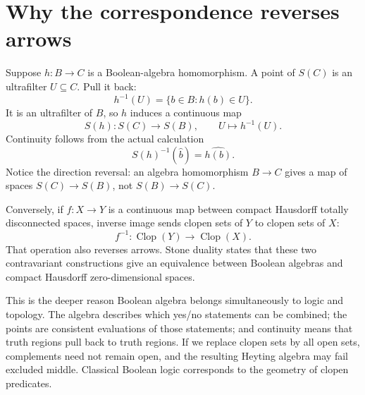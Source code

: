 \section{Why the correspondence reverses arrows}

Suppose \(h:B\to C\) is a Boolean-algebra homomorphism. A point of \(S(C)\) is an ultrafilter \(U\subseteq C\). Pull it back:
\[
 h^{-1}(U)=\{b\in B:h(b)\in U\}.
\]
It is an ultrafilter of \(B\), so \(h\) induces a continuous map
\[
 S(h):S(C)\longrightarrow S(B),\qquad
 U\longmapsto h^{-1}(U).
\]
Continuity follows from the actual calculation
\[
 S(h)^{-1}(\widehat b)=\widehat{h(b)}.
\]
Notice the direction reversal: an algebra homomorphism \(B\to C\) gives a map of spaces \(S(C)\to S(B)\), not \(S(B)\to S(C)\).

Conversely, if \(f:X\to Y\) is a continuous map between compact Hausdorff totally disconnected spaces, inverse image sends clopen sets of \(Y\) to clopen sets of \(X\):
\[
 f^{-1}:\operatorname{Clop}(Y)\longrightarrow\operatorname{Clop}(X).
\]
That operation also reverses arrows. Stone duality states that these two contravariant constructions give an equivalence between Boolean algebras and compact Hausdorff zero-dimensional spaces.

This is the deeper reason Boolean algebra belongs simultaneously to logic and topology. The algebra describes which yes/no statements can be combined; the points are consistent evaluations of those statements; and continuity means that truth regions pull back to truth regions. If we replace clopen sets by all open sets, complements need not remain open, and the resulting Heyting algebra may fail excluded middle. Classical Boolean logic corresponds to the geometry of clopen predicates.
